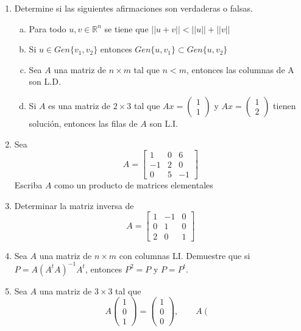 \documentclass[12pt]{article}
\newenvironment{preguntas}
{\begin{enumerate}\itemsep12pt
	}
	{
	\end{enumerate}
}
\newcommand{\R}{\mathbb{R}}
\begin{document}
\begin{preguntas}
$$\begin{bmatrix}
0 & 1 & 3\\
0 & -2 & -6
\end{bmatrix}$$
Demuestre que la imagen del plano $\mathbb{P}$ bajo la transformación $T$ es una recta en $\R^4$.
\item Determine si las siguientes afirmaciones son verdaderas o falsas.
\begin{enumerate}[a)]
\item Para todo $u, v \in \R^n$ se tiene que $||u+v|| < ||u||+||v||$
\item Si $u \in Gen\{v_1, v_2\}$ entonces $Gen\{u, v_1\} \subset Gen\{u, v_2\}$
\item Sea $A$ una matriz de $n \times m$ tal que $n < m $, entonces las columnas de A son L.D.
\item Si $A$ es una matriz de $2 \times 3$ tal que $Ax = \begin{pmatrix}
		1\\
		1
		\end{pmatrix}$ y $ Ax = \begin{pmatrix}
		1\\
		2
		\end{pmatrix}$ tienen solución, entonces las filas de $A$ son L.I.
\end{enumerate}
\item Sea
	$$A = \begin{bmatrix}
	1 & 0 & 6\\
	-1 & 2 & 0\\
	0 & 5 & -1
	\end{bmatrix}$$
	Escriba $A$ como un producto de matrices elementales
\item Determinar la matriz inversa de
$$A = \begin{bmatrix}
1 & -1 & 0 \\
0 & 1 & 0 \\
2 & 0 & 1
\end{bmatrix}$$
\item Sea $A$ una matriz de $n\times m$ con columnas LI. Demuestre que si $P=A(A^tA)^{-1}A^{t}$, entonces $P^2=P$ y $P=P^t$.
\item Sea $A$ una matriz de $3\times 3$ tal que
      $$A\left(\begin{array}{r}
  1\\0\\1
\end{array}\right)= \left(\begin{array}{r}
  1\\0\\0
\end{array}\right),\quad\quad A \left(\begin{array}{r}

\end{array}$$
\end{preguntas}
\end{document}
